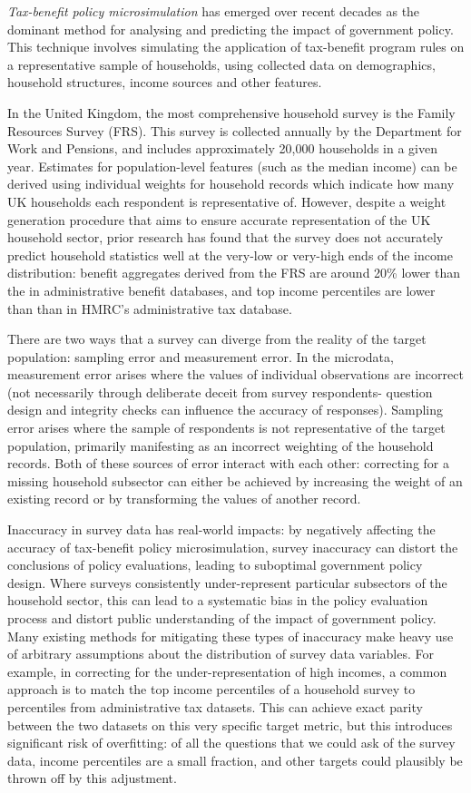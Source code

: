 \documentclass[twocolumn]{article}
\begin{document}
\emph{Tax-benefit policy microsimulation} has emerged over recent decades as the dominant method for analysing and predicting the impact of government policy. This technique involves simulating the application of tax-benefit program rules on a representative sample of households, using collected data on demographics, household structures, income sources and other features.

In the United Kingdom, the most comprehensive household survey is the Family Resources Survey (FRS). This survey is collected annually by the Department for Work and Pensions, and includes approximately 20,000 households in a given year. Estimates for population-level features (such as the median income) can be derived using individual weights for household records which indicate how many UK households each respondent is representative of. However, despite a weight generation procedure that aims to ensure accurate representation of the UK household sector, prior research has found that the survey does not accurately predict household statistics well at the very-low or very-high ends of the income distribution: benefit aggregates derived from the FRS are around 20\% lower than the in administrative benefit databases, and top income percentiles are lower than than in HMRC's administrative tax database.

There are two ways that a survey can diverge from the reality of the target population: sampling error and measurement error. In the microdata, measurement error arises where the values of individual observations are incorrect (not necessarily through deliberate deceit from survey respondents- question design and integrity checks can influence the accuracy of responses). Sampling error arises where the sample of respondents is not representative of the target population, primarily manifesting as an incorrect weighting of the household records. Both of these sources of error interact with each other: correcting for a missing household subsector can either be achieved by increasing the weight of an existing record or by transforming the values of another record.

Inaccuracy in survey data has real-world impacts: by negatively affecting the accuracy of tax-benefit policy microsimulation, survey inaccuracy can distort the conclusions of policy evaluations, leading to suboptimal government policy design. Where surveys consistently under-represent particular subsectors of the household sector, this can lead to a systematic bias in the policy evaluation process and distort public understanding of the impact of government policy. Many existing methods for mitigating these types of inaccuracy make heavy use of arbitrary assumptions about the distribution of survey data variables. For example, in correcting for the under-representation of high incomes, a common approach is to match the top income percentiles of a household survey to percentiles from administrative tax datasets. This can achieve exact parity between the two datasets on this very specific target metric, but this introduces significant risk of overfitting: of all the questions that we could ask of the survey data, income percentiles are a small fraction, and other targets could plausibly be thrown off by this adjustment.
\end{document}
